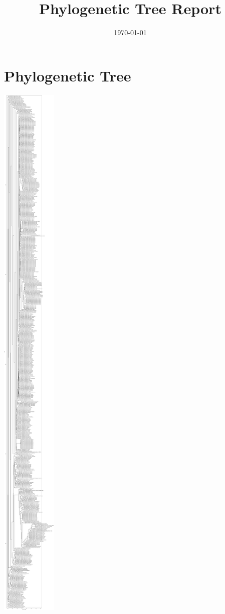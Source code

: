 \documentclass[11pt]{article}
\title{Phylogenetic Tree Report}
\date{\today}
\begin{document}
\maketitle
\clearpage
\section*{Phylogenetic Tree}
\vspace*{1em}
\begin{center}
\includegraphics[width=\linewidth,height=0.9\textheight,keepaspectratio]{tree_rendered.pdf}
\end{center}
\vspace*{2cm}
\end{document}
